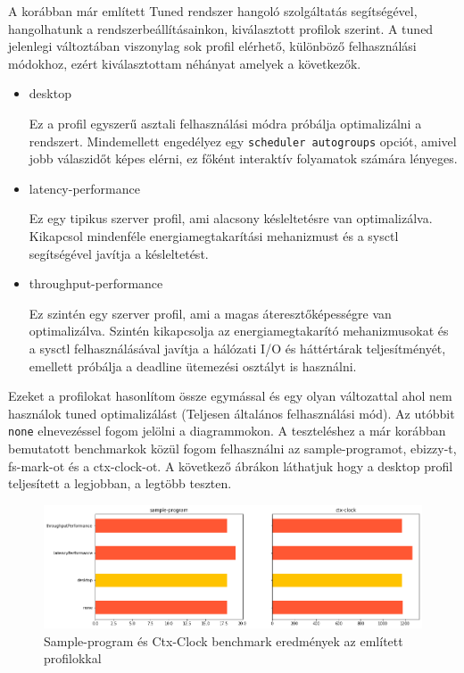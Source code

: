 A korábban már említett Tuned rendszer hangoló szolgáltatás segítségével, hangolhatunk a rendszerbeállításainkon, kiválasztott profilok szerint.
A tuned jelenlegi változtában viszonylag sok profil elérhető, különböző felhasználási módokhoz, ezért kiválasztottam néhányat amelyek a következők.
\begin{itemize}
\item desktop

Ez a profil egyszerű asztali felhasználási módra próbálja optimalizálni a rendszert.
Mindemellett engedélyez egy \texttt{scheduler autogroups} opciót, amivel jobb válaszidőt képes elérni, ez főként interaktív folyamatok számára lényeges.

\item latency-performance

Ez egy tipikus szerver profil, ami alacsony késleltetésre van optimalizálva. Kikapcsol mindenféle energiamegtakarítási mehanizmust és a sysctl segítségével javítja a késleltetést.

\item throughput-performance

Ez szintén egy szerver profil, ami a magas áteresztőképességre van optimalizálva.
Szintén kikapcsolja az energiamegtakarító mehanizmusokat és a sysctl felhasználásával javítja a hálózati I/O és háttértárak teljesítményét, emellett próbálja a deadline ütemezési osztályt is használni.
\end{itemize}

Ezeket a profilokat hasonlítom össze egymással és egy olyan változattal ahol nem használok tuned optimalizálást (Teljesen általános felhasználási mód).
Az utóbbit \texttt{none} elnevezéssel fogom jelölni a diagrammokon.
A teszteléshez a már korábban bemutatott benchmarkok közül fogom felhasználni az sample-programot, ebizzy-t, fs-mark-ot és a ctx-clock-ot.
A következő ábrákon láthatjuk hogy a desktop profil teljesített a legjobban, a legtöbb teszten.
\begin{figure}[h!]
\centering
\includegraphics[width=\textwidth]{images/sampleProgramAndCtxClock.png}
\caption{Sample-program és Ctx-Clock benchmark eredmények az említett profilokkal}
\label{fig:tunedProfilesSampleprogramAndCtxClock}
\end{figure}

